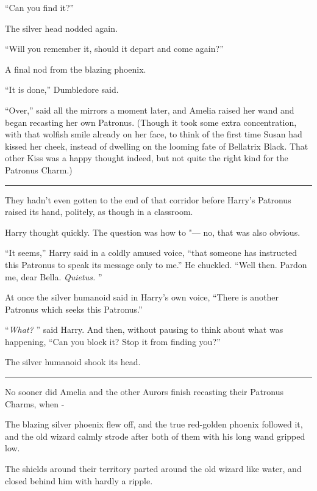``Can you find it?''

The silver head nodded again.

``Will you remember it, should it depart and come again?''

A final nod from the blazing phoenix.

``It is done,'' Dumbledore said.

``Over,'' said all the mirrors a moment later, and Amelia raised her
wand and began recasting her own Patronus. (Though it took some extra
concentration, with that wolfish smile already on her face, to think of
the first time Susan had kissed her cheek, instead of dwelling on the
looming fate of Bellatrix Black. That other Kiss was a happy thought
indeed, but not quite the right kind for the Patronus Charm.)

\begin{center}\rule{3in}{0.4pt}\end{center}

They hadn't even gotten to the end of that corridor before Harry's
Patronus raised its hand, politely, as though in a classroom.

Harry thought quickly. The question was how to "--- no, that was also
obvious.

``It seems,'' Harry said in a coldly amused voice, ``that someone has
instructed this Patronus to speak its message only to me.'' He chuckled.
``Well then. Pardon me, dear Bella. \emph{Quietus.} ''

At once the silver humanoid said in Harry's own voice, ``There is
another Patronus which seeks this Patronus.''

``\emph{What?} '' said Harry. And then, without pausing to think about
what was happening, ``Can you block it? Stop it from finding you?''

The silver humanoid shook its head.

\begin{center}\rule{3in}{0.4pt}\end{center}

No sooner did Amelia and the other Aurors finish recasting their
Patronus Charms, when -

The blazing silver phoenix flew off, and the true red-golden phoenix
followed it, and the old wizard calmly strode after both of them with
his long wand gripped low.

The shields around their territory parted around the old wizard like
water, and closed behind him with hardly a ripple.

